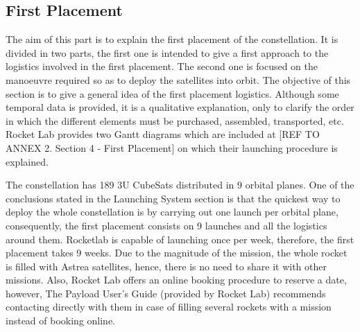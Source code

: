 \subsection{First Placement}
The aim of this part is to explain the first placement of the constellation. It is divided in two parts, the first one is intended to give a first approach to the logistics involved in the first placement. The second one is focused on the manoeuvre required so as to deploy the satellites into orbit. 
The objective of this section is to give a general idea of the first placement logistics. Although some temporal data is provided, it is a qualitative explanation, only to clarify the order in which the different elements must be purchased, assembled, transported, etc. %
Rocket Lab provides two Gantt diagrams which are included at  [{REF TO ANNEX 2. Section 4 - First Placement}] on which their launching procedure is explained.
%

The constellation has 189 3U CubeSats distributed in 9 orbital planes. One of the conclusions stated in the Launching System section  is that the quickest way to deploy the whole constellation is by carrying out one launch per orbital plane, consequently, the first placement consists on 9 launches and all the logistics around them. Rocketlab is capable of launching once per week, therefore, the first placement takes 9 weeks. Due to the magnitude of the mission, the whole rocket is filled with Astrea satellites, hence, there is no need to share it with other missions. Also, Rocket Lab offers an online booking procedure to reserve a date, however, The Payload User's Guide (provided by Rocket Lab) recommends contacting directly with them in case of filling several rockets with a mission instead of booking online.  

